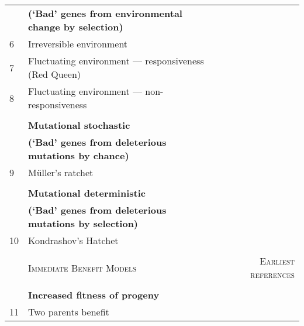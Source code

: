 \begin{table}
{\begin{tabular}{@{}llr@{}}
            & \textbf{(`Bad' genes from environmental change by selection)}  &                              \\
6           & Irreversible environment                                       & \cite{charlesworth_mutation_1993}            \\
7           & Fluctuating environment --- responsiveness (Red Queen)                    & \cite{van_valen_new_1973}           \\
8           & Fluctuating environment --- non-responsiveness                 & \cite{sturtevant_interrelations_1938}   \\
            &                                                                & \textbf{}                    \\
            & \textbf{Mutational stochastic}                                 & \textbf{}                    \\
            & \textbf{(`Bad' genes from deleterious mutations by chance)}    &                              \\
9           & M\"uller's ratchet                                               & \cite{muller_relation_1964}                  \\
            &                                                                & \textbf{}                    \\
            & \textbf{Mutational deterministic}                              & \textbf{}                    \\
            & \textbf{(`Bad' genes from deleterious mutations by selection)} &                              \\
10          & Kondrashov's Hatchet                                           & \cite{kondrashov_selection_1982}              \\
\textbf{}   &                                                                &                              \\ \midrule
\textbf{}   & \textsc{Immediate Benefit Models}                              & \textsc{Earliest references} \\
            &                                                                & \textbf{}                    \\
            & \textbf{Increased fitness of progeny}                          &                              \\
11          & Two parents benefit                                            & \cite{lloyd_benefits_1980}                   \\

\end{tabular}}
\end{table}
